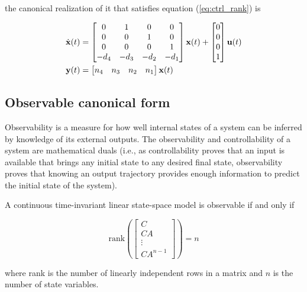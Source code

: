 the canonical \gls{realization} of it that satisfies equation
(\ref{eq:ctrl_rank}) is

\begin{align}
  \dot{\mathbf{x}}(t) &=
  \begin{bmatrix}
    0 & 1 & 0 & 0 \\
    0 & 0 & 1 & 0 \\
    0 & 0 & 0 & 1 \\
    -d_4 & -d_3 & -d_2 & -d_1
  \end{bmatrix}
  \mathbf{x}(t) +
  \begin{bmatrix}
    0 \\
    0 \\
    0 \\
    1
  \end{bmatrix}
  \mathbf{u}(t) \\
  \mathbf{y}(t) &=
  \begin{bmatrix}
    n_4 & n_3 & n_2 & n_1
  \end{bmatrix}
  \mathbf{x}(t)
\end{align}

\subsection{Observable canonical form} \label{subsubsec:obsv-canon}

Observability is a measure for how well internal \glspl{state} of a \gls{system}
can be inferred by knowledge of its external outputs. The observability and
controllability of a \gls{system} are mathematical duals (i.e., as
controllability proves that an input is available that brings any initial
\gls{state} to any desired final \gls{state}, observability proves that knowing
an output trajectory provides enough information to predict the initial
\gls{state} of the \gls{system}).

\begin{theorem}
  A continuous \gls{time-invariant} linear state-space \gls{model} is observable
  if and only if

  \begin{equation} \label{eq:obsv_rank}
    \text{rank} \left(
    \begin{bmatrix}
      C \\
      CA \\
      \vdots \\
      CA^{n-1}
    \end{bmatrix}\right) = n
  \end{equation}

  where rank is the number of linearly independent rows in a matrix and $n$ is
  the number of \gls{state} variables.
\end{theorem}

